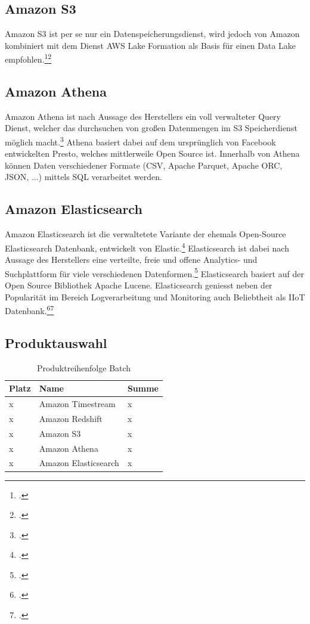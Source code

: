 \subsection{Amazon S3}
Amazon \acf{S3} ist per se nur ein Datenspeicherungsdienst, wird jedoch von Amazon kombiniert mit dem Dienst AWS Lake Formation als Basis für einen Data Lake empfohlen.\footcite[Vgl.][]{AmazonWebServicesInc..o.J.f}\nzitat\footcite[Vgl.][2\psqq]{AmazonWebServicesInc..2017}

\subsection{Amazon Athena}
Amazon Athena ist nach Aussage des Herstellers ein voll verwalteter Query Dienst, welcher das durchsuchen von großen Datenmengen im \ac{S3} Speicherdienst möglich macht.\footcite[Vgl.][]{Barr.2016} Athena basiert dabei auf dem ursprünglich von Facebook entwickelten Presto, welches mittlerweile Open Source ist. Innerhalb von Athena können Daten verschiedener Formate (\ac{CSV}, Apache Parquet, Apache ORC, \ac{JSON}, ...) mittels \ac{SQL} verarbeitet werden.

\subsection{Amazon Elasticsearch}
Amazon Elasticsearch ist die verwaltetete Variante der ehemals Open-Source Elasticsearch Datenbank, entwickelt von Elastic.\footcite[Vgl.][]{Barr.01.10.2015} Elasticsearch ist dabei nach Aussage des Herstellers eine verteilte, freie und offene Analytics- und Suchplattform für viele verschiedenen Datenformen.\footcite[Vgl.][]{ElasticsearchInc..o.J.} Elasticsearch basiert auf der Open Source Bibliothek Apache Lucene. Elasticsearch geniesst neben der Popularität im Bereich Logverarbeitung und Monitoring auch Beliebtheit als \ac{IIoT} Datenbank.\footcite[Vgl.][]{Mantfeld.2019}\nzitat\footcite[Vgl.][]{Bajer.2017}


\subsection{Produktauswahl}
\begin{table}[H]
\centering
\begin{tabular}{|l|l|l|}
\hline
Platz & Name & Summe \\ \hline
x & Amazon Timestream & \cellcolor[HTML]{DAE8FC}x \\ \hline
x & Amazon Redshift & \cellcolor[HTML]{DAE8FC}x \\ \hline
x & Amazon S3 & \cellcolor[HTML]{DAE8FC}x \\ \hline
x & Amazon Athena & \cellcolor[HTML]{DAE8FC}x \\ \hline
x & Amazon Elasticsearch & \cellcolor[HTML]{DAE8FC}x \\ \hline
\end{tabular}
\caption{Produktreihenfolge Batch}
\label{tab:Reihenfolge-Batch}
\end{table}





